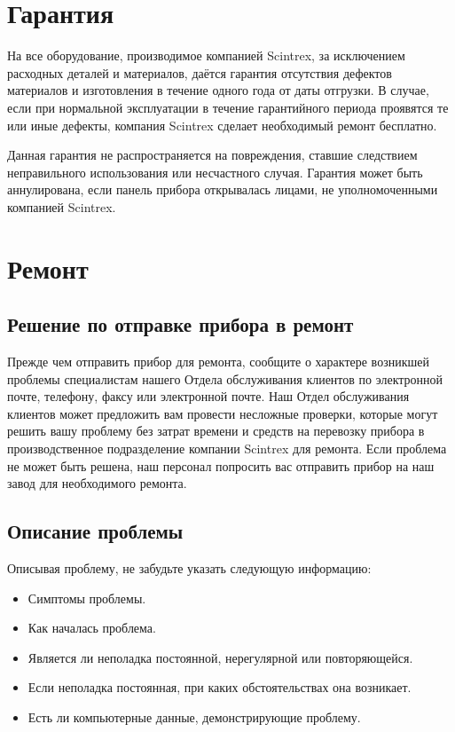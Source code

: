 
\section{Гарантия}

На все оборудование, производимое компанией Scintrex, за исключением расходных
деталей и материалов, даётся гарантия отсутствия дефектов материалов и
изготовления в течение одного года от даты отгрузки. В случае, если при
нормальной эксплуатации в течение гарантийного периода проявятся те или иные
дефекты, компания Scintrex сделает необходимый ремонт бесплатно.

Данная гарантия не распространяется на повреждения, ставшие следствием
неправильного использования или несчастного случая. Гарантия может быть
аннулирована, если панель прибора открывалась лицами, не уполномоченными
компанией Scintrex.

\section{Ремонт}

\subsection{Решение по отправке прибора в ремонт}

Прежде чем отправить прибор для ремонта, сообщите о характере возникшей проблемы
специалистам нашего Отдела обслуживания клиентов по электронной почте, телефону,
факсу или электронной почте. Наш Отдел обслуживания клиентов может предложить
вам провести несложные проверки, которые могут решить вашу проблему без затрат
времени и средств на перевозку прибора в производственное подразделение компании
Scintrex для ремонта. Если проблема не может быть решена, наш персонал попросить
вас отправить прибор на наш завод для необходимого ремонта.

\subsection{Описание проблемы}

Описывая проблему, не забудьте указать следующую информацию:
\begin{itemize}
  \item Симптомы проблемы.

  \item Как началась проблема.

  \item Является ли неполадка постоянной, нерегулярной или повторяющейся.

  \item Если неполадка постоянная, при каких обстоятельствах она возникает.

  \item Есть ли компьютерные данные, демонстрирующие проблему.
\end{itemize}

